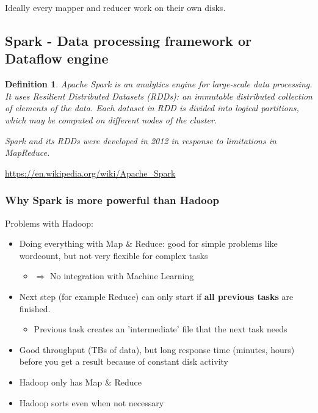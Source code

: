 \documentclass{article}
\newtheorem{theorem}{Definition}[section]
\begin{document}
Ideally every mapper and reducer work on their own disks.

\subsection{Spark - Data processing framework or Dataflow engine}

\begin{theorem}
    Apache Spark is an analytics engine for large-scale data processing. 
    It uses Resilient Distributed Datasets (RDDs): an immutable
    distributed collection of elements of the data. 
    Each dataset in RDD is divided into logical partitions, 
    which may be computed on different nodes of the cluster.
    
    Spark and its RDDs were developed in 2012 in response to limitations in MapReduce.
\end{theorem}

\url{https://en.wikipedia.org/wiki/Apache_Spark}

\subsubsection{Why Spark is more powerful than Hadoop}

Problems with Hadoop:

\begin{itemize}
    \item Doing everything with Map \& Reduce: good for simple problems like wordcount, but not very flexible for complex tasks
    \begin{itemize}
        \item $\Rightarrow$ No integration with Machine Learning
    \end{itemize}
    \item Next step (for example Reduce) can only start if \textbf{all previous tasks} are finished. 
    \begin{itemize}
        \item Previous task creates an 'intermediate' file that the next task needs
    \end{itemize}
    \item Good throughput (TBs of data), but long response time (minutes, hours) before you get a result because of constant disk activity
    \item Hadoop only has Map \& Reduce
    \item Hadoop sorts even when not necessary
\end{itemize}
    
\end{document}
